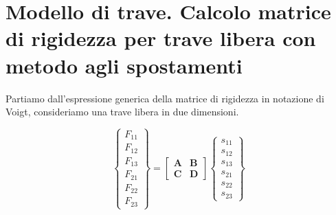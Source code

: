 \section{Modello di trave. Calcolo matrice di rigidezza per trave libera con metodo agli spostamenti}

Partiamo dall'espressione generica della matrice di rigidezza in notazione di Voigt, consideriamo una trave libera in due dimensioni.


\begin{equation*}
\left\{
\begin{array}{c}
F_{11}\\
F_{12} \\
F_{13} \\
F_{21} \\
F_{22} \\
F_{23}
\end{array}
\right\}
=
\begin{bmatrix}
\mathbf{A} & \mathbf{B} \\
\mathbf{C} & \mathbf{D}
\end{bmatrix}
\left\{
\begin{array}{c}
s_{11} \\
s_{12} \\
s_{13} \\
s_{21} \\
s_{22} \\
s_{23}
\end{array}
\right\}
\end{equation*}

